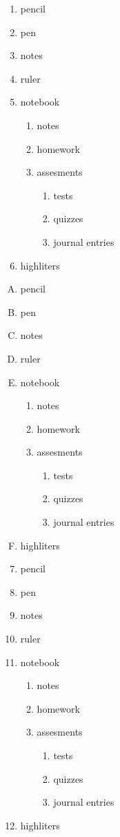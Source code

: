 \documentclass[11pt]{article}
\begin{document}
\begin{enumerate}
\item pencil
\item pen
\item notes
\item ruler
\item notebook
	\begin{enumerate}
	\item notes
	\item homework
	\item assesments
		\begin{enumerate}
		\item tests
		\item quizzes
		\item journal entries
		\end{enumerate}
	\end{enumerate}
\item highliters
\end{enumerate}

\vspace{1cm}

\begin{enumerate}[A.]
\item pencil
\item pen
\item notes
\item ruler
\item notebook
	\begin{enumerate}
	\item notes
	\item homework
	\item assesments
		\begin{enumerate}
		\item tests
		\item quizzes
		\item journal entries
		\end{enumerate}
	\end{enumerate}
\item highliters
\end{enumerate}

\vspace{1cm}

\begin{enumerate}\setcounter{enumi}{6}
\item pencil
\item pen
\item notes
\item ruler
\item notebook
	\begin{enumerate}
	\item notes
	\item homework
	\item assesments
		\begin{enumerate}
		\item tests
		\item quizzes
		\item journal entries
		\end{enumerate}
	\end{enumerate}
\item highliters
\end{enumerate}
\end{document}
